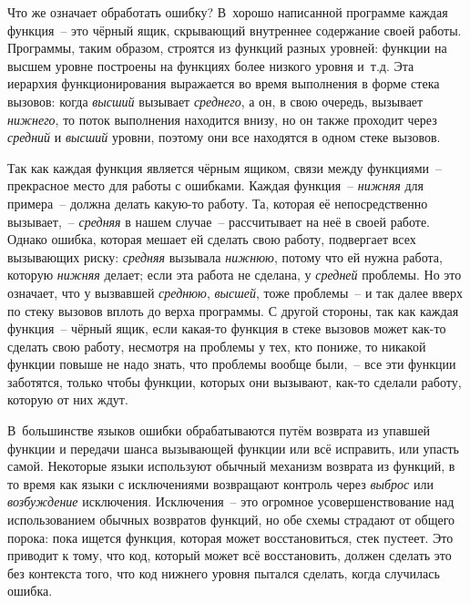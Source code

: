 Что же означает обработать ошибку? В~хорошо написанной программе каждая функция~-- это
чёрный ящик, скрывающий внутреннее содержание своей работы. Программы, таким образом,
строятся из функций разных уровней: функции на высшем уровне построены на функциях более
низкого уровня и~т.д.  Эта иерархия функционирования выражается во время выполнения в
форме стека вызовов: когда \emph{высший} вызывает \emph{среднего}, а он, в свою очередь,
вызывает \emph{нижнего}, то поток выполнения находится внизу, но он также проходит через
\emph{средний} и \emph{высший} уровни, поэтому они все находятся в одном стеке вызовов.

Так как каждая функция является чёрным ящиком, связи между функциями~-- прекрасное место
для работы с ошибками. Каждая функция~-- \emph{нижняя} для примера~-- должна делать
какую-то работу. Та, которая её непосредственно вызывает,~-- \emph{средняя} в нашем
случае~-- рассчитывает на неё в своей работе. Однако ошибка, которая мешает ей сделать
свою работу, подвергает всех вызывающих риску: \emph{средняя} вызывала \emph{нижнюю},
потому что ей нужна работа, которую \emph{нижняя} делает; если эта работа не сделана, у
\emph{средней} проблемы. Но это означает, что у вызвавшей \emph{среднюю}, \emph{высшей},
тоже проблемы~-- и так далее вверх по стеку вызовов вплоть до верха программы. С другой
стороны, так как каждая функция~-- чёрный ящик, если какая-то функция в стеке вызовов
может как-то сделать свою работу, несмотря на проблемы у тех, кто пониже, то никакой
функции повыше не надо знать, что проблемы вообще были,~-- все эти функции заботятся,
только чтобы функции, которых они вызывают, как-то сделали работу, которую от них ждут.

В~большинстве языков ошибки обрабатываются путём возврата из упавшей функции и передачи
шанса вызывающей функции или всё исправить, или упасть самой. Некоторые языки используют
обычный механизм возврата из функций, в то время как языки с исключениями возвращают
контроль через \textit{выброс} или \textit{возбуждение} исключения. Исключения~-- это
огромное усовершенствование над использованием обычных возвратов функций, но обе схемы
страдают от общего порока: пока ищется функция, которая может восстановиться, стек
пустеет. Это приводит к тому, что код, который может всё восстановить, должен сделать это
без контекста того, что код нижнего уровня пытался сделать, когда случилась ошибка.


